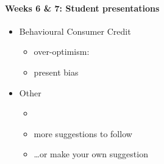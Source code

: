 \documentclass[a4paper,11pt]{article}
\begin{document}
\paragraph{Weeks 6 \& 7: Student presentations}

\begin{itemize}
\item Behavioural Consumer Credit
  \begin{itemize}
  \item over-optimism: \citep{exler2020over-optimistic}
  \item present bias \citep{laibson2021present}
  \end{itemize}
\item Other
  \begin{itemize}
  \item \citet{laibson2022mpc-to-mpx}
  \item more suggestions to follow
  \item \dots or make your own suggestion
  \end{itemize}
\end{itemize}





\end{document}
